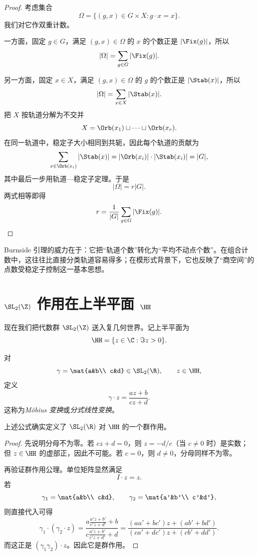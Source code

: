 \begin{proof}
考虑集合
\[
\Omega=\{(g,x)\in G\times X:g\cdot x=x\}.
\]
我们对它作双重计数。

一方面，固定 $g\in G$，满足 $(g,x)\in\Omega$ 的 $x$ 的个数正是 $|\Fix(g)|$，所以
\[
|\Omega|=\sum_{g\in G}|\Fix(g)|.
\]

另一方面，固定 $x\in X$，满足 $(g,x)\in\Omega$ 的 $g$ 的个数正是 $|\Stab(x)|$，所以
\[
|\Omega|=\sum_{x\in X}|\Stab(x)|.
\]
把 $X$ 按轨道分解为不交并
\[
X=\Orb(x_1)\sqcup\cdots\sqcup\Orb(x_r).
\]
在同一轨道中，稳定子大小相同到共轭，因此每个轨道的贡献为
\[
\sum_{x\in \Orb(x_i)}|\Stab(x)|=|\Orb(x_i)|\cdot |\Stab(x_i)|=|G|,
\]
其中最后一步用轨道—稳定子定理。于是
\[
|\Omega|=r|G|.
\]
两式相等即得
\[
r=\frac{1}{|G|}\sum_{g\in G}|\Fix(g)|.
\]
\end{proof}

\begin{remark}
Burnside 引理的威力在于：它把“轨道个数”转化为“平均不动点个数”。在组合计数中，这往往比直接分类轨道容易得多；在模形式背景下，它也反映了“商空间”的点数受稳定子控制这一基本思想。
\end{remark}

\section{$\SL_2(\Z)$ 作用在上半平面 $\HH$}

现在我们把代数群 $\SL_2(\Z)$ 送入复几何世界。记上半平面为
\[
\HH=\{z\in\C:\Im z>0\}.
\]

\begin{definition}
对
\[
\gamma=\mat{a&b\\ c&d}\in \SL_2(\R),
\qquad z\in \HH,
\]
定义
\[
\gamma\cdot z=\frac{az+b}{cz+d}.
\]
这称为\emph{Möbius 变换}或\emph{分式线性变换}。
\end{definition}

\begin{proposition}
上述公式确实定义了 $\SL_2(\R)$ 对 $\HH$ 的一个群作用。
\end{proposition}

\begin{proof}
先说明分母不为零。若 $cz+d=0$，则 $z=-d/c$（当 $c\ne 0$ 时）是实数；但 $z\in\HH$ 的虚部正，因此不可能。若 $c=0$，则 $d\ne 0$，分母同样不为零。

再验证群作用公理。单位矩阵显然满足
\[
I\cdot z=z.
\]
若
\[
\gamma_1=\mat{a&b\\ c&d},
\qquad
\gamma_2=\mat{a'&b'\\ c'&d'},
\]
则直接代入可得
\[
\gamma_1\cdot(\gamma_2\cdot z)
=\frac{a\frac{a'z+b'}{c'z+d'}+b}{c\frac{a'z+b'}{c'z+d'}+d}
=\frac{(aa'+bc')z+(ab'+bd')}{(ca'+dc')z+(cb'+dd')}.
\]
而这正是 $(\gamma_1\gamma_2)\cdot z$。因此它是群作用。
\end{proof}

